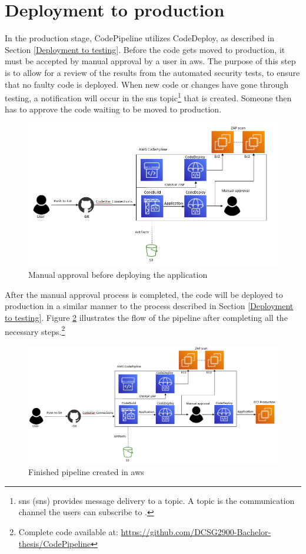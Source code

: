 \section{Deployment to production}
In the production stage, CodePipeline utilizes CodeDeploy, as described in Section \ref{Deployment to testing}. Before the code gets moved to production, it must be accepted by manual approval by a user in \acrshort{aws}. The purpose of this step is to allow for a review of the results from the automated security tests, to ensure that no faulty code is deployed. When new code or changes have gone through testing, a notification will occur in the \acrshort{sns} topic\footnote{\acrlong{sns} (\acrshort{sns}) provides message delivery to a topic. A topic is the communication channel the users can subscribe to \cite{SNStopic}.} that is created. Someone then has to approve the code waiting to be moved to production.

\vspace{2mm}
\begin{figure}[H]
    \centering
    \includegraphics[width=0.8\columnwidth]{Images/aws-piplin-6.png}
    \caption{Manual approval before deploying the application}
    \label{fig: Manual approval before deploying the application}
\end{figure}

After the manual approval process is completed, the code will be deployed to production in a similar manner to the process described in Section \ref{Deployment to testing}. Figure \ref{fig: Finished pipeline created in AWS} illustrates the flow of the pipeline after completing all the necessary steps.\footnote{Complete code available at: \url{https://github.com/DCSG2900-Bachelor-thesis/CodePipeline}}

\vspace{2mm}
\begin{figure}[H]
    \centering
    \includegraphics[width=0.8\columnwidth]{Images/aws-piplin-7.png}
    \caption{Finished pipeline created in \acrshort{aws}}
    \label{fig: Finished pipeline created in AWS}
\end{figure}